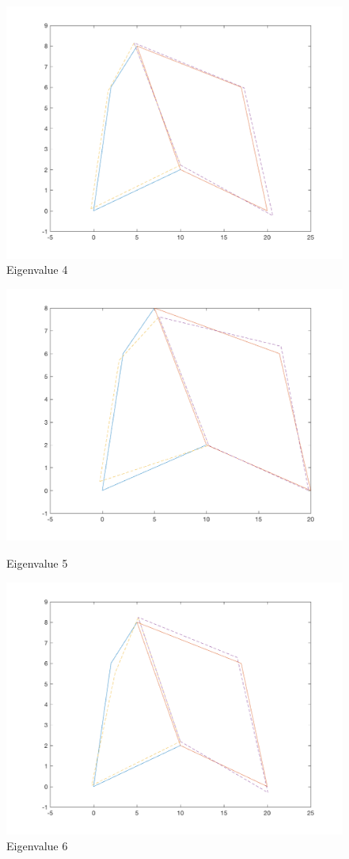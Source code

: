 \documentclass[11pt]{amsart}
\begin{document}
\begin{figure}[H]
\begin{minipage}[b]{0.5\linewidth}
    \centering
    \includegraphics[width=.5\linewidth]{eigenvectors/eigenvector_4_redint.png} 
    \caption{Eigenvalue 4} 
    \vspace{4ex}
  \end{minipage} 
\end{figure}

\begin{figure}[H] 
  \label{fig5} 
  \begin{minipage}[b]{0.5\linewidth}
    \centering
    \includegraphics[width=.5\linewidth]{eigenvectors/eigenvector_5_redint.png} 
    \caption{Eigenvalue 5} 
    \vspace{4ex}
  \end{minipage}%
  \begin{minipage}[b]{0.5\linewidth}
    \centering
    \includegraphics[width=.5\linewidth]{eigenvectors/eigenvector_6_redint.png} 
    \caption{Eigenvalue 6} 
    \vspace{4ex}
  \end{minipage} 
  \begin{minipage}[b]{0.5\linewidth}

\end{minipage}
\end{figure}
\end{document}
